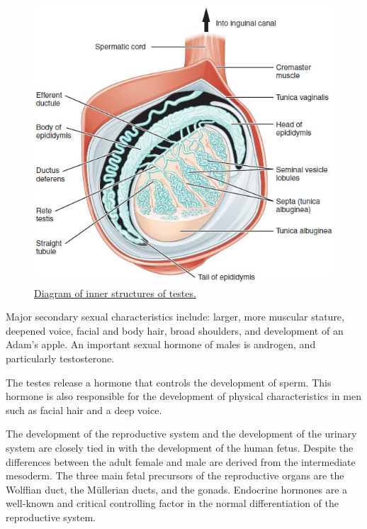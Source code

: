 \begin{figure}

{\centering \includegraphics[width=0.7\linewidth]{./figures/reproductive_system/Figure_28_01_03} 

}

\caption{\href{https://commons.wikimedia.org/wiki/File:Figure_28_01_03.JPG}{Diagram of inner structures of testes.}}\label{fig:testesdiagram}
\end{figure}

Major secondary sexual characteristics include: larger, more muscular stature, deepened voice, facial and body hair, broad shoulders, and development of an Adam's apple. An important sexual hormone of males is androgen, and particularly testosterone.

The testes release a hormone that controls the development of sperm. This hormone is also responsible for the development of physical characteristics in men such as facial hair and a deep voice.

The development of the reproductive system and the development of the urinary system are closely tied in with the development of the human fetus. Despite the differences between the adult female and male are derived from the intermediate mesoderm. The three main fetal precursors of the reproductive organs are the Wolffian duct, the Müllerian ducts, and the gonads. Endocrine hormones are a well-known and critical controlling factor in the normal differentiation of the reproductive system.



